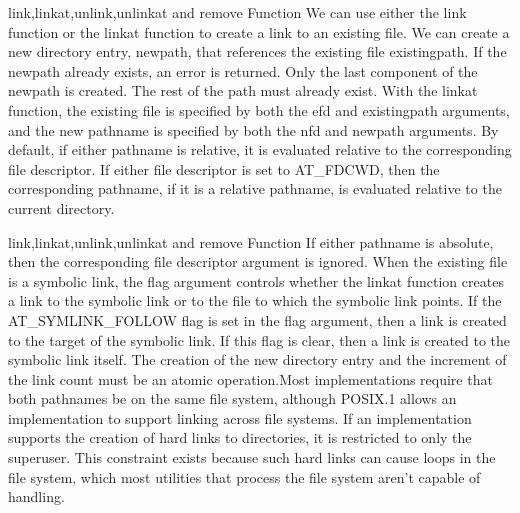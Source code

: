 \documentclass{beamer}
\begin{document}
\begin{frame}[t]{link,linkat,unlink,unlinkat and remove Function}
We can use either the link function or the linkat function to create a link
to an existing file.
We can create a new directory entry, newpath, that references the existing file
existingpath. If the newpath already exists, an error is returned. Only the last component
of the newpath is created. The rest of the path must already exist.
With the linkat function, the existing file is specified by both the efd and
existingpath arguments, and the new pathname is specified by both the nfd and newpath
arguments. By default, if either pathname is relative, it is evaluated relative to the
corresponding file descriptor. If either file descriptor is set to AT\_FDCWD, then the
corresponding pathname, if it is a relative pathname, is evaluated relative to the current
directory. 
\end{frame}
\begin{frame}[t]{link,linkat,unlink,unlinkat and remove Function}
If either pathname is absolute, then the corresponding file descriptor
argument is ignored.
When the existing file is a symbolic link, the flag argument controls whether the
linkat function creates a link to the symbolic link or to the file to which the symbolic
link points. If the AT\_SYMLINK\_FOLLOW flag is set in the flag argument, then a link is
created to the target of the symbolic link. If this flag is clear, then a link is created to the
symbolic link itself.
The creation of the new directory entry and the increment of the link count must be
an atomic operation.Most implementations require that both pathnames be on the same file system,
although POSIX.1 allows an implementation to support linking across file systems. If
an implementation supports the creation of hard links to directories, it is restricted to
only the superuser. This constraint exists because such hard links can cause loops in the
file system, which most utilities that process the file system aren’t capable of handling.





\end{frame}
\end{document}
